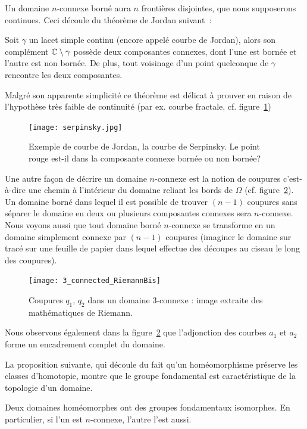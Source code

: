 Un domaine $n$-connexe borné aura $n$ frontières disjointes, que nous supposerons continues. Ceci découle du théorème de Jordan suivant~:
\begin{theorem}
Soit $\gamma$ un lacet simple continu (encore appelé courbe de Jordan), alors son complément $\mathbb{C} \setminus \gamma$ possède deux composantes connexes, dont l'une est bornée et l'autre est non bornée. De plus, tout voisinage d'un point quelconque de $\gamma$ rencontre les deux composantes.
\end{theorem}

Malgré son apparente simplicité ce théorème est délicat à prouver en raison de l'hypothèse très faible de continuité (par ex. courbe fractale, cf. figure~\ref{fig:serpinsky})
\begin{figure}[ht]
 \begin{center}
\texttt{[image: serpinsky.jpg]} \end{center}
\caption{Exemple de courbe de Jordan, la courbe de Serpinsky. Le point rouge est-il dans la composante connexe bornée ou non bornée?}\label{fig:serpinsky}
\end{figure}

Une autre façon de décrire un domaine $n$-connexe est la notion de coupures c'est-à-dire une chemin à l'intérieur du domaine reliant les bords de $\Omega$ (cf. figure~\ref{fig:Riemann}). Un domaine borné dans lequel il est possible de trouver $(n-1)$ coupures sans séparer le domaine en deux ou plusieurs composantes connexes sera $n$-connexe. Nous voyons aussi que tout domaine borné $n$-connexe se transforme en un domaine simplement connexe par $(n-1)$ coupures (imaginer le domaine sur tracé sur une feuille de papier dans lequel effectue des découpes au ciseau le long des coupures).

\begin{figure}[ht]
 \begin{center}
\texttt{[image: 3\_connected\_RiemannBis]}\hspace*{0.2cm}\end{center}
\caption{Coupures $q_1$, $q_2$ dans un domaine $3$-connexe : image extraite des mathématiques de Riemann.}\label{fig:Riemann}
\end{figure}

Nous observons également dans la figure~\ref{fig:Riemann} que l'adjonction des courbes $a_1$ et $a_2$ forme un encadrement complet du domaine.

La proposition suivante, qui découle du fait qu'un homéomorphisme préserve les classes d'homotopie, montre que le groupe fondamental est caractéristique de la topologie d'un domaine.
\begin{fprop}
Deux domaines homéomorphes ont des groupes fondamentaux isomorphes. En particulier, si l'un est $n$-connexe, l'autre l'est aussi.
\end{fprop}


